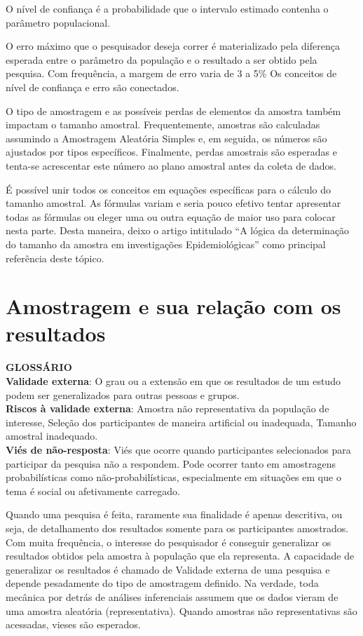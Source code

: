 \documentclass[
]{book}
\begin{document}
O nível de confiança é a probabilidade que o intervalo estimado contenha o parâmetro populacional.

O erro máximo que o pesquisador deseja correr é materializado pela diferença esperada entre o parâmetro da população e o resultado a ser obtido pela pesquisa. Com frequência, a margem de erro varia de 3 a 5\% Os conceitos de nível de confiança e erro são conectados.

O tipo de amostragem e as possíveis perdas de elementos da amostra também impactam o tamanho amostral. Frequentemente, amostras são calculadas assumindo a Amostragem Aleatória Simples e, em seguida, os números são ajustados por tipos específicos. Finalmente, perdas amostrais são esperadas e tenta-se acrescentar este número ao plano amostral antes da coleta de dados.

É possível unir todos os conceitos em equações específicas para o cálculo do tamanho amostral. As fórmulas variam e seria pouco efetivo tentar apresentar todas as fórmulas ou eleger uma ou outra equação de maior uso para colocar nesta parte. Desta maneira, deixo o artigo intitulado ``A lógica da determinação do tamanho da amostra em investigações Epidemiológicas'' como principal referência deste tópico.

\hypertarget{amostragem-e-sua-relauxe7uxe3o-com-os-resultados}{%
\section{Amostragem e sua relação com os resultados}\label{amostragem-e-sua-relauxe7uxe3o-com-os-resultados}}

\begin{glossario}
\textbf{GLOSSÁRIO}\\
\textbf{Validade externa}: O grau ou a extensão em que os resultados de
um estudo podem ser generalizados para outras pessoas e grupos.\\
\textbf{Riscos à validade externa}: Amostra não representativa da
população de interesse, Seleção dos participantes de maneira artificial
ou inadequada, Tamanho amostral inadequado.\\
\textbf{Viés de não-resposta}: Viés que ocorre quando participantes
selecionados para participar da pesquisa não a respondem. Pode ocorrer
tanto em amostragens probabilísticas como não-probabilísticas,
especialmente em situações em que o tema é social ou afetivamente
carregado.
\end{glossario}

Quando uma pesquisa é feita, raramente sua finalidade é apenas descritiva, ou seja, de detalhamento dos resultados somente para os participantes amostrados. Com muita frequência, o interesse do pesquisador é conseguir generalizar os resultados obtidos pela amostra à população que ela representa. A capacidade de generalizar os resultados é chamado de Validade externa de uma pesquisa e depende pesadamente do tipo de amostragem definido. Na verdade, toda mecânica por detrás de análises inferenciais assumem que os dados vieram de uma amostra aleatória (representativa). Quando amostras não representativas são acessadas, vieses são esperados.
\end{document}
